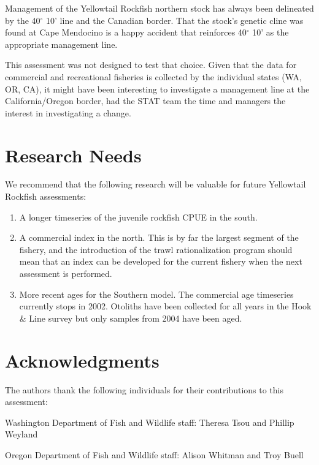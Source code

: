 \documentclass[12pt,]{article}
\begin{document}
Management of the Yellowtail Rockfish northern stock has always been
delineated by the 40\(^\circ\) 10' line and the Canadian border. That
the stock's genetic cline was found at Cape Mendocino is a happy
accident that reinforces 40\(^\circ\) 10' as the appropriate management
line.

This assessment was not designed to test that choice. Given that the
data for commercial and recreational fisheries is collected by the
individual states (WA, OR, CA), it might have been interesting to
investigate a management line at the California/Oregon border, had the
STAT team the time and managers the interest in investigating a change.

\section{Research Needs}\label{research-needs}

We recommend that the following research will be valuable for future
Yellowtail Rockfish assessments:

\begin{enumerate}

\item A longer timeseries of the juvenile rockfish CPUE in the south.

\item A commercial index in the north.  This is by far the largest segment of the fishery, and the introduction of the trawl rationalization program should mean that an index can be developed for the current fishery when the next assessment is performed.

\item More recent ages for the Southern model.  The commercial age timeseries currently stops in 2002. Otoliths have been collected for all years in the Hook \& Line survey but only samples from 2004 have been aged.

\end{enumerate}

\section{Acknowledgments}\label{acknowledgments}

The authors thank the following individuals for their contributions to
this assessment:

Washington Department of Fish and Wildlife staff: Theresa Tsou and
Phillip Weyland

Oregon Department of Fish and Wildlife staff: Alison Whitman and Troy
Buell
\end{document}
